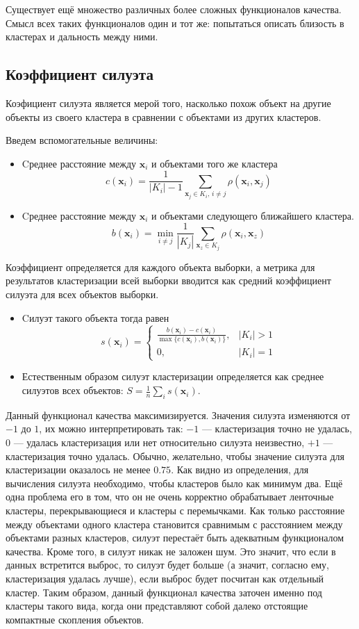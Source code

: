 \documentclass[10pt]{article}
\begin{document}
Существует ещё множество различных более сложных функционалов качества. Смысл всех таких функционалов один и тот же: попытаться описать близость в кластерах и дальность между ними.
\subsection{Коэффициент силуэта}
Коэфициент силуэта является мерой того, насколько похож объект на другие объекты из своего кластера в сравнении с объектами из других кластеров.

Введем вспомогательные величины:
\begin{itemize}
	\item Cреднее расстояние между $\pmb x_i$ и объектами того же кластера $$ c(\pmb x_i) = \frac{1}{|K_i| - 1}\sum\limits_{\pmb x_j \in K_i,\, i\neq j}\rho(\pmb x_i, \pmb x_j) $$ 
	\item Cреднее расстояние между $\pmb x_i$ и объектами следующего ближайшего кластера. $$ b(\pmb x_i) = \min\limits_{i\neq j}\frac{1}{|K_j|}\sum\limits_{\pmb x_z \in K_j}\rho(\pmb x_i, \pmb x_z) $$ 
\end{itemize}

Коэффициент определяется для каждого объекта выборки, а метрика для результатов кластеризации всей выборки вводится как средний коэффициент силуэта для всех объектов выборки.
\begin{itemize}
	\item Cилуэт такого объекта тогда равен  $$ s(\pmb x_i) = \begin{cases} \frac{b(\pmb x_i) - c(\pmb x_i)}{\max\{c(\pmb x_i), b(\pmb x_i)\}}, & |K_i| > 1\\ 0, & |K_i| = 1 \end{cases} $$ 
	\item Естественным образом силуэт кластеризации определяется как среднее силуэтов всех объектов: $S =\frac{1}{n}\sum\limits_{i}s(\pmb x_i)$. 
\end{itemize}
Данный функционал качества максимизируется. Значения силуэта изменяются от $-1$ до $1$, их можно интерпретировать так: $-1$ --- кластеризация
точно не удалась, $0$ --- удалась кластеризация или нет относительно силуэта неизвестно, $+1$ --- кластеризация точно удалась. Обычно, желательно, чтобы значение силуэта
для кластеризации оказалось не менее $0.75$. Как видно из определения, для вычисления силуэта необходимо, чтобы кластеров было как минимум два. Ещё одна проблема его в том, что он не очень корректно обрабатывает ленточные кластеры, перекрывающиеся и кластеры с перемычками. Как только расстояние между объектами одного кластера становится сравнимым с расстоянием между объектами разных кластеров, силуэт перестаёт быть адекватным функционалом качества. Кроме того, в силуэт никак не заложен шум. Это значит, что если в данных встретится выброс, то силуэт будет больше (а значит, согласно ему, кластеризация удалась лучше), если выброс будет посчитан как отдельный кластер. Таким образом, данный функционал качества заточен именно под кластеры такого вида, когда они представляют собой далеко отстоящие компактные скопления объектов.
\end{document}
